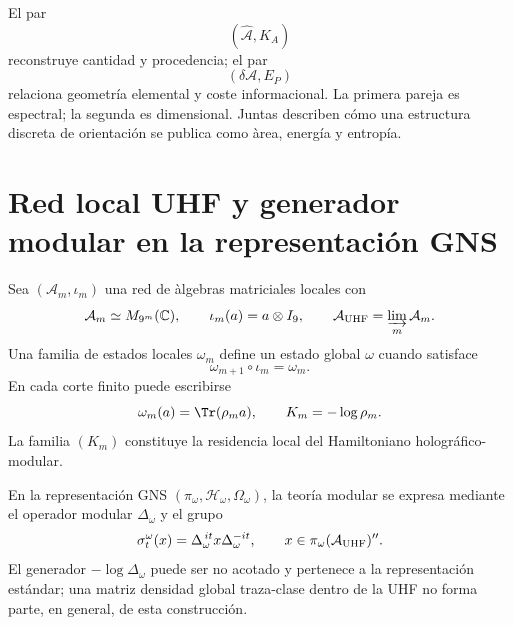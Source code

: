 El par
\begin{equation}
 \left(
 \widehat{\mathcal A},K_A
 \right)
 \label{eq:rm-info-area-K-pair}
\end{equation}
reconstruye cantidad y procedencia; el par
\begin{equation}
 \left(
 \delta\mathcal A,E_P
 \right)
 \label{eq:rm-info-area-energy-pair}
\end{equation}
relaciona geometr\'ia elemental y coste informacional. La primera pareja es
espectral; la segunda es dimensional. Juntas describen c\'omo una estructura
discreta de orientaci\'on se publica como \`area, energ\'ia y entrop\'ia.

\section{Red local UHF y generador modular en la representaci\'on GNS}

Sea \((\mathcal A_m,\iota_m)\) una red de \`algebras matriciales locales
con
\begin{equation}
 \mathcal A_m\simeq M_{9^m}(\mathbb C),
 \qquad
 \iota_m(a)=a\otimes I_9,
 \qquad
 \mathcal A_{\rm UHF}=\varinjlim_m\mathcal A_m.
 \label{eq:rm-info-uhf-net}
\end{equation}
Una familia de estados locales \(\omega_m\) define un estado global
\(\omega\) cuando satisface
\begin{equation}
 \omega_{m+1}\circ\iota_m=\omega_m.
 \label{eq:rm-info-state-compatibility}
\end{equation}
En cada corte finito puede escribirse
\begin{equation}
 \omega_m(a)=\Tr(\rho_m a),
 \qquad
 K_m=-\log\rho_m.
 \label{eq:rm-info-local-densities}
\end{equation}
La familia \((K_m)\) constituye la residencia local del Hamiltoniano
hologr\'afico-modular.

En la representaci\'on GNS
\((\pi_\omega,\mathcal H_\omega,\Omega_\omega)\), la teor\'ia modular se
expresa mediante el operador modular \(\Delta_\omega\) y el grupo
\begin{equation}
 \sigma_t^\omega(x)
 =\Delta_\omega^{\,it}x\Delta_\omega^{-it},
 \qquad
 x\in\pi_\omega(\mathcal A_{\rm UHF})''.
 \label{eq:rm-info-gns-modular-flow}
\end{equation}
El generador \(-\log\Delta_\omega\) puede ser no acotado y pertenece a la
representaci\'on est\'andar; una matriz densidad global traza-clase dentro de
la UHF no forma parte, en general, de esta construcci\'on.

